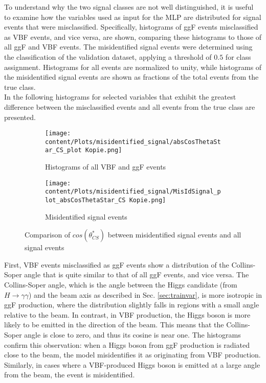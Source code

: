 To understand why the two signal classes are not well distinguished, it is useful to examine how the variables used as input for the MLP are distributed for signal events that were misclassified.
Specifically, histograms of ggF events misclassified as VBF events, and vice versa, are shown, comparing these histograms to those of all ggF and VBF events. The misidentified signal events were determined
using the classification of the validation dataset, applying a threshold of $0.5$ for class assignment. Histograms for all events are normalized to unity, while histograms of the misidentified signal events
are shown as fractions of the total events from the true class. \\

In the following histograms for selected variables that exhibit the greatest difference between the misclassified events and all events from the true class are presented.

\begin{figure}[htbp]
    \centering
    \begin{subfigure}{0.45\textwidth}
        \centering
        \texttt{[image: content/Plots/misidentified\_signal/absCosThetaStar\_CS\_plot Kopie.png]}
        \caption{Histograms of all VBF and ggF events}
        \label{fig:roc1}
    \end{subfigure}
    \hfill
    \begin{subfigure}{0.45\textwidth}
        \centering
        \texttt{[image: content/Plots/misidentified\_signal/MisIdSignal\_plot\_absCosThetaStar\_CS Kopie.png]}
        \caption{Misidentified signal events}
        \label{fig:roc2}
    \end{subfigure}
    \caption{Comparison of $cos(\theta_{CS}^*)$ between misidentified signal events and all signal events}
    \label{fig:combined_roc}
\end{figure}

First, VBF events misclassified as ggF events show a distribution of the Collins-Soper angle that is quite similar to that of all ggF events, and vice versa. The Collins-Soper angle, which is the angle
between the Higgs candidate (from $H \rightarrow \gamma \gamma$) and the beam axis as described in Sec. \ref{sec:trainvar}, is more isotropic in ggF production, where the distribution slightly falls in regions with a small angle relative to the beam.
In contrast, in VBF production, the Higgs boson is more likely to be emitted in the direction of the beam. This means that the Collins-Soper angle is close to zero, and thus its cosine is near one.
The histograms confirm this observation: when a Higgs boson from ggF production is radiated close to the beam, the model misidentifies it as originating from VBF production. Similarly, in cases where a
VBF-produced Higgs boson is emitted at a large angle from the beam, the event is misidentified.

